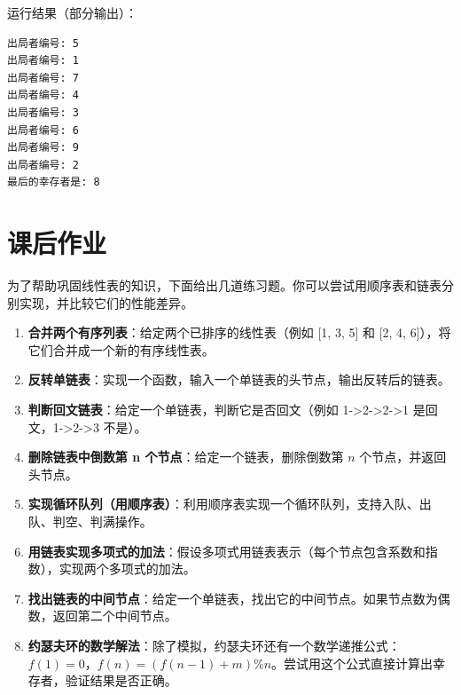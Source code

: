 运行结果（部分输出）：

\begin{verbatim}
出局者编号: 5
出局者编号: 1
出局者编号: 7
出局者编号: 4
出局者编号: 3
出局者编号: 6
出局者编号: 9
出局者编号: 2
最后的幸存者是: 8
\end{verbatim}

\section{课后作业}

为了帮助巩固线性表的知识，下面给出几道练习题。你可以尝试用顺序表和链表分别实现，并比较它们的性能差异。

\begin{enumerate}
    \item \textbf{合并两个有序列表}：给定两个已排序的线性表（例如 [1, 3, 5] 和 [2, 4, 6]），将它们合并成一个新的有序线性表。
    \item \textbf{反转单链表}：实现一个函数，输入一个单链表的头节点，输出反转后的链表。
    \item \textbf{判断回文链表}：给定一个单链表，判断它是否回文（例如 1->2->2->1 是回文，1->2->3 不是）。
    \item \textbf{删除链表中倒数第 n 个节点}：给定一个链表，删除倒数第 \(n\) 个节点，并返回头节点。
    \item \textbf{实现循环队列（用顺序表）}：利用顺序表实现一个循环队列，支持入队、出队、判空、判满操作。
    \item \textbf{用链表实现多项式的加法}：假设多项式用链表表示（每个节点包含系数和指数），实现两个多项式的加法。
    \item \textbf{找出链表的中间节点}：给定一个单链表，找出它的中间节点。如果节点数为偶数，返回第二个中间节点。
    \item \textbf{约瑟夫环的数学解法}：除了模拟，约瑟夫环还有一个数学递推公式：\(f(1) = 0\)，\(f(n) = (f(n-1) + m) \% n\)。尝试用这个公式直接计算出幸存者，验证结果是否正确。
\end{enumerate}